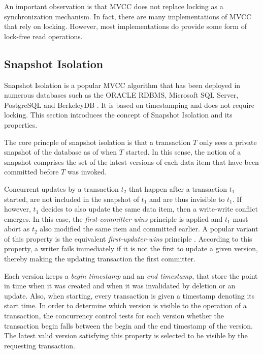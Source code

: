 An important observation is that MVCC does not replace locking as a
synchronization mechanism. In fact, there are many implementations of MVCC that
rely on locking. However, most implementations do provide some form of lock-free
read operations.

\subsection{Snapshot Isolation}

Snapshot Isolation \cite{berenson1995critique} is a popular MVCC algorithm that
has been deployed in numerous databases such as the ORACLE RDBMS, Microsoft SQL
Server, PostgreSQL and BerkeleyDB \cite{cahill2009serializable}. It is based on
timestamping and does not require locking. This section introduces the concept
of Snapshot Isolation and its properties.

The core princple of snapshot isolation is that a transaction $T$ only sees a
private snapshot of the database as of when $T$ started. In this sense, the
notion of a snapshot comprises the set of the latest versions of each data item
that have been committed before $T$ was invoked.

Concurrent updates by a transaction $t_2$ that happen after a transaction $t_1$
started, are not included in the snapshot of $t_1$ and are thus invisible to
$t_1$. If however, $t_1$ decides to also update the same data item, then a
write-write conflict emerges. In this case, the \textit{first-committer-wins}
principle is applied and $t_1$ must abort as $t_2$ also modified the same item
and committed earlier. A popular variant of this property is the equivalent
\textit{first-updater-wins} principle \cite{fekete2004read, larson2011high}.
According to this property, a writer fails immediately if it is not the first to
update a given version, thereby making the updating transaction the first
committer.

Each version keeps a \textit{begin timestamp} and an \textit{end timestamp},
that store the point in time when it was created and when it was invalidated by
deletion or an update. Also, when starting, every transaction is given a
timestamp denoting its start time. In order to determine which version is
visible to the operation of a transaction, the concurrency control tests for
each version whether the transaction begin falls between the begin and the end
timestamp of the version. The latest valid version satisfying this property is
selected to be visible by the requesting transaction.

